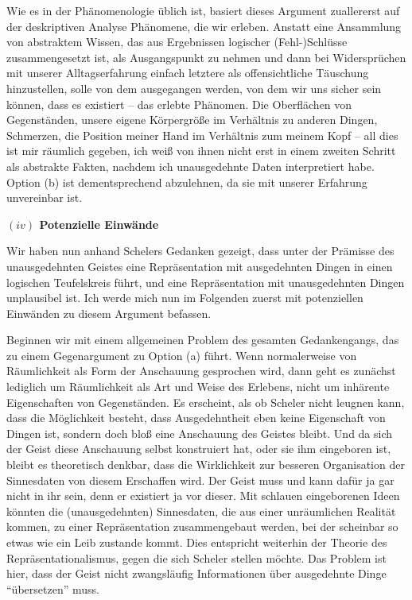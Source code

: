 \documentclass[a4paper, 12pt]{article}
\begin{document}
\begin{onehalfspace}

Wie es in der Phänomenologie üblich ist, basiert dieses Argument zuallererst auf der deskriptiven Analyse Phänomene, die wir erleben. Anstatt eine Ansammlung von abstraktem Wissen, das aus Ergebnissen logischer (Fehl-)Schlüsse zusammengesetzt ist, als Ausgangspunkt zu nehmen und dann bei Widersprüchen mit unserer Alltagserfahrung einfach letztere als offensichtliche Täuschung hinzustellen, solle von dem ausgegangen werden, von dem wir uns sicher sein können, dass es existiert -- das erlebte Phänomen. Die Oberflächen von Gegenständen, unsere eigene Körpergröße im Verhältnis zu anderen Dingen, Schmerzen, die Position meiner Hand im Verhältnis zum meinem Kopf -- all dies ist mir räumlich gegeben, ich weiß von ihnen nicht erst in einem zweiten Schritt als abstrakte Fakten, nachdem ich unausgedehnte Daten interpretiert habe. Option (b) ist dementsprechend abzulehnen, da sie mit unserer Erfahrung unvereinbar ist.

\vspace{5mm}
\noindent\textbf{$(iv)$ Potenzielle Einwände} 


\noindent Wir haben nun anhand Schelers Gedanken gezeigt, dass unter der Prämisse des unausgedehnten Geistes eine Repräsentation mit ausgedehnten Dingen in einen logischen Teufelskreis führt, und eine Repräsentation mit unausgedehnten Dingen unplausibel ist. Ich werde mich nun im Folgenden zuerst mit potenziellen Einwänden zu diesem Argument befassen.


Beginnen wir mit einem allgemeinen Problem des gesamten Gedankengangs, das zu einem Gegenargument zu Option (a) führt. Wenn normalerweise von Räumlichkeit als Form der Anschauung gesprochen wird, dann geht es zunächst lediglich um Räumlichkeit als Art und Weise des Erlebens, nicht um inhärente Eigenschaften von Gegenständen. Es erscheint, als ob Scheler nicht leugnen kann, dass die Möglichkeit besteht, dass Ausgedehntheit eben keine Eigenschaft von Dingen ist, sondern doch bloß eine Anschauung des Geistes bleibt. Und da sich der Geist diese Anschauung selbst konstruiert hat, oder sie ihm eingeboren ist, bleibt es theoretisch denkbar, dass die Wirklichkeit zur besseren Organisation der Sinnesdaten von diesem Erschaffen wird. Der Geist muss und kann dafür ja gar nicht in ihr sein, denn er existiert ja vor dieser. Mit schlauen eingeborenen Ideen könnten die (unausgedehnten) Sinnesdaten, die aus einer unräumlichen Realität kommen, zu einer Repräsentation zusammengebaut werden, bei der scheinbar so etwas wie ein Leib zustande kommt. Dies entspricht weiterhin der Theorie des Repräsentationalismus, gegen die sich Scheler stellen möchte. Das Problem ist hier, dass der Geist nicht zwangsläufig Informationen über ausgedehnte Dinge "`übersetzen"' muss. 


\end{onehalfspace}
\end{document}
